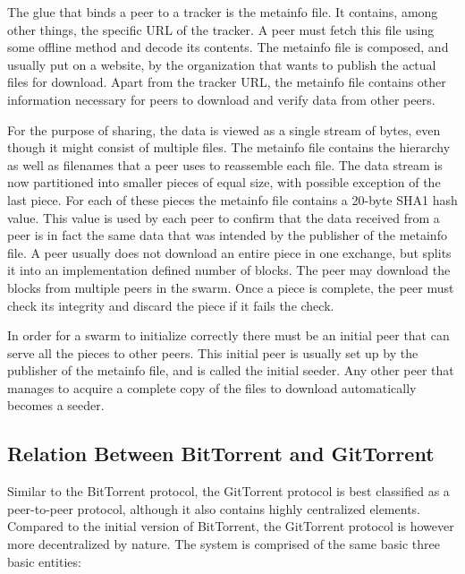The glue that binds a peer to a tracker is the metainfo file.  It
contains, among other things, the specific URL of the tracker. A peer
must fetch this file using some offline method and decode its
contents. The metainfo file is composed, and usually put on a website,
by the organization that wants to publish the actual files for
download. Apart from the tracker URL, the metainfo file contains other
information necessary for peers to download and verify data from other
peers.

For the purpose of sharing, the data is viewed as a single stream of
bytes, even though it might consist of multiple files. The metainfo
file contains the hierarchy as well as filenames that a peer uses to
reassemble each file. The data stream is now partitioned into smaller
pieces of equal size, with possible exception of the last piece. For
each of these pieces the metainfo file contains a 20-byte SHA1 hash
value. This value is used by each peer to confirm that the data
received from a peer is in fact the same data that was intended by the
publisher of the metainfo file. A peer usually does not download an
entire piece in one exchange, but splits it into an implementation
defined number of blocks. The peer may download the blocks from
multiple peers in the swarm. Once a piece is complete, the peer must
check its integrity and discard the piece if it fails the check.

In order for a swarm to initialize correctly there must be an initial peer
that can serve all the pieces to other peers. This initial peer is usually
set up by the publisher of the metainfo file, and is called the initial
seeder. Any other peer that manages to acquire a complete copy of the
files to download automatically becomes a seeder.

\subsection{Relation Between BitTorrent and GitTorrent}

Similar to the BitTorrent protocol, the GitTorrent protocol is best
classified as a peer-to-peer protocol, although it also contains
highly centralized elements. Compared to the initial version of
BitTorrent, the GitTorrent protocol is however more decentralized by
nature. The system is comprised of the same basic three basic entities:

